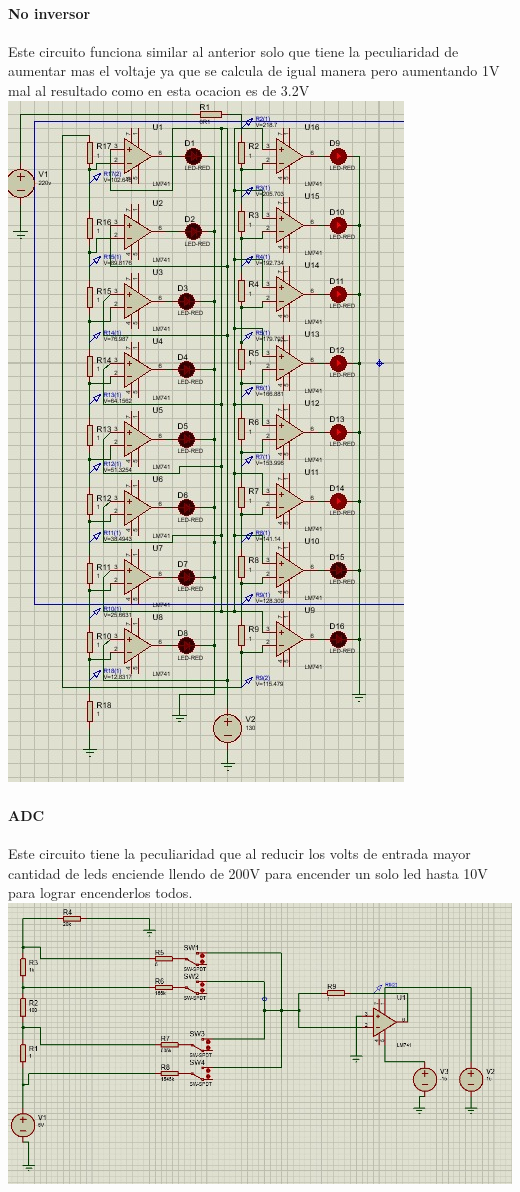 \documentclass[12pt,a4paper]{report}
\begin{document}
\paragraph{No inversor }
Este circuito funciona similar al anterior solo que tiene la peculiaridad de aumentar mas el voltaje ya que se calcula de igual manera pero aumentando 1V mal al resultado como en esta ocacion es de 3.2V
\\
\includegraphics[scale=.5]{adc.jpg}
\paragraph{ADC}
Este circuito tiene la peculiaridad que al reducir los volts de entrada mayor cantidad de leds enciende llendo de 200V para encender un solo led hasta 10V para lograr encenderlos todos.
\\
\includegraphics[scale=1]{dac.jpg}   
\end{document}

